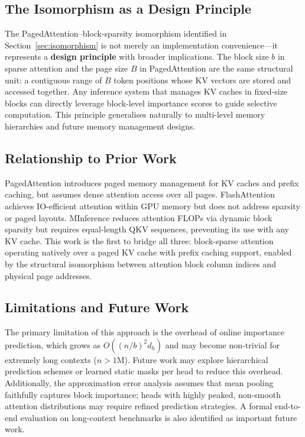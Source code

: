 \documentclass{article}
\begin{document}
\subsection{The Isomorphism as a Design Principle}

The PagedAttention--block-sparsity isomorphism identified in
Section~\ref{sec:isomorphism} is not merely an implementation
convenience---it represents a \textbf{design principle} with broader
implications. The block size $b$ in sparse attention and the page size $B$
in PagedAttention are the same structural unit: a contiguous range of
$B$ token positions whose KV vectors are stored and accessed together.
Any inference system that manages KV caches in fixed-size blocks can
directly leverage block-level importance scores to guide selective
computation. This principle generalises naturally to multi-level memory
hierarchies and future memory management designs.

\subsection{Relationship to Prior Work}

PagedAttention \cite{pagedattention} introduces paged memory management
for KV caches and prefix caching, but assumes dense attention access over
all pages. FlashAttention \cite{flashattention,flashattention2} achieves
IO-efficient attention within GPU memory but does not address sparsity or
paged layouts. MInference \cite{minference} reduces attention FLOPs via
dynamic block sparsity but requires equal-length QKV sequences, preventing
its use with any KV cache. This work is the first to bridge all three:
block-sparse attention operating natively over a paged KV cache with prefix
caching support, enabled by the structural isomorphism between attention
block column indices and physical page addresses.

\subsection{Limitations and Future Work}

The primary limitation of this approach is the overhead of online
importance prediction, which grows as $O((n/b)^2 d_h)$ and may become
non-trivial for extremely long contexts ($n > 1\text{M}$). Future work
may explore hierarchical prediction schemes or learned static masks per
head to reduce this overhead. Additionally, the approximation error
analysis assumes that mean pooling faithfully captures block importance;
heads with highly peaked, non-smooth attention distributions may require
refined prediction strategies. A formal end-to-end evaluation on
long-context benchmarks is also identified as important future work.
\end{document}
